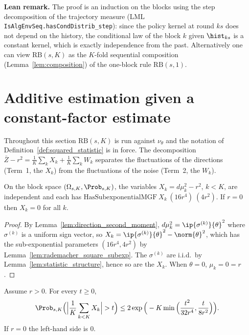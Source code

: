 \textbf{Lean remark.} The proof is an induction on the blocks using the step decomposition
of the trajectory measure (LML \texttt{IsAlgEnvSeq.hasCondDistrib\_step}): since the policy
kernel at round $ks$ does not depend on the history, the conditional law of the block
$k$ given $\hist_{ks}$ is a constant kernel, which is exactly independence from the past.
Alternatively one can view $\mathrm{RB}(s,K)$ as the $K$-fold sequential composition
(Lemma~\ref{lem:composition}) of the one-block rule $\mathrm{RB}(s,1)$.

\section{Additive estimation given a constant-factor estimate}
\label{sec:norm_additive}

Throughout this section $\mathrm{RB}(s,K)$ is run against $\nu_\theta$ and the notation of
Definition~\ref{def:squared_statistic} is in force. The decomposition
$\bar Z - r^2 = \frac1K\sum_k X_k + \frac1K\sum_k W_k$ separates the fluctuations of the
directions (Term~1, the $X_k$) from the fluctuations of the noise (Term~2, the $W_k$).

\begin{lemma}\label{lem:term1_subexp}
\leanok
{}
On the block space $(\Omega_{s,K}, \Prob_{s,K})$, the variables $X_k = d\mu_k^2 - r^2$,
$k < K$, are independent and each has $\mathrm{HasSubexponentialMGF}\ X_k\ (16 r^4)\ (4r^2)$.
If $r = 0$ then $X_k = 0$ for all $k$.
\end{lemma}

\begin{proof}
\leanok
{}
By Lemma~\ref{lem:direction_second_moment}, $d\mu_k^2 = \ip{\sigma^{(k)}}{\theta}^2$ where
$\sigma^{(k)}$ is a uniform sign vector, so $X_k = \ip{\sigma^{(k)}}{\theta}^2 - \norm{\theta}^2$,
which has the sub-exponential parameters $(16r^4, 4r^2)$ by
Lemma~\ref{lem:rademacher_square_subexp}. The $\sigma^{(k)}$ are i.i.d.\ by
Lemma~\ref{lem:statistic_structure}, hence so are the $X_k$. When $\theta = 0$,
$\mu_k = 0 = r$.
\end{proof}

\begin{lemma}\label{lem:term1_bound}
\leanok
{}
Assume $r > 0$. For every $t \ge 0$,
\[
  \Prob_{s,K}\Big( \Big| \frac1K\sum_{k<K} X_k \Big| > t \Big)
  \le 2\exp\Big( -K \min\Big( \frac{t^2}{32 r^4}, \frac{t}{8 r^2} \Big) \Big).
\]
If $r = 0$ the left-hand side is $0$.
\end{lemma}

